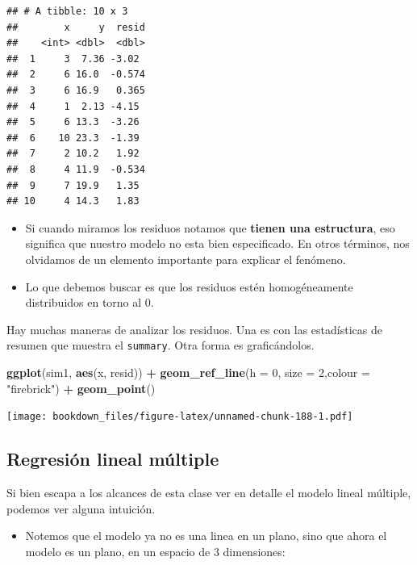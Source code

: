\documentclass[]{book}
\newenvironment{Shaded}{\begin{snugshade}}{\end{snugshade}}
\newcommand{\DataTypeTok}[1]{\textcolor[rgb]{0.13,0.29,0.53}{#1}}
\newcommand{\DecValTok}[1]{\textcolor[rgb]{0.00,0.00,0.81}{#1}}
\newcommand{\KeywordTok}[1]{\textcolor[rgb]{0.13,0.29,0.53}{\textbf{#1}}}
\newcommand{\NormalTok}[1]{#1}
\newcommand{\OperatorTok}[1]{\textcolor[rgb]{0.81,0.36,0.00}{\textbf{#1}}}
\newcommand{\StringTok}[1]{\textcolor[rgb]{0.31,0.60,0.02}{#1}}
\providecommand{\tightlist}{%
  \setlength{\itemsep}{0pt}\setlength{\parskip}{0pt}}
\begin{document}
\begin{verbatim}
## # A tibble: 10 x 3
##        x     y  resid
##    <int> <dbl>  <dbl>
##  1     3  7.36 -3.02 
##  2     6 16.0  -0.574
##  3     6 16.9   0.365
##  4     1  2.13 -4.15 
##  5     6 13.3  -3.26 
##  6    10 23.3  -1.39 
##  7     2 10.2   1.92 
##  8     4 11.9  -0.534
##  9     7 19.9   1.35 
## 10     4 14.3   1.83
\end{verbatim}

\begin{itemize}
\tightlist
\item
  Si cuando miramos los residuos notamos que \textbf{tienen una estructura}, eso significa que nuestro modelo no esta bien especificado. En otros términos, nos olvidamos de un elemento importante para explicar el fenómeno.
\item
  Lo que debemos buscar es que los residuos estén homogéneamente distribuidos en torno al 0.
\end{itemize}

Hay muchas maneras de analizar los residuos. Una es con las estadísticas de resumen que muestra el \texttt{summary}. Otra forma es graficándolos.

\begin{Shaded}
\begin{Highlighting}[]
\KeywordTok{ggplot}\NormalTok{(sim1, }\KeywordTok{aes}\NormalTok{(x, resid)) }\OperatorTok{+}\StringTok{ }
\StringTok{  }\KeywordTok{geom_ref_line}\NormalTok{(}\DataTypeTok{h =} \DecValTok{0}\NormalTok{, }\DataTypeTok{size =} \DecValTok{2}\NormalTok{,}\DataTypeTok{colour =} \StringTok{"firebrick"}\NormalTok{) }\OperatorTok{+}
\StringTok{  }\KeywordTok{geom_point}\NormalTok{() }
\end{Highlighting}
\end{Shaded}

\texttt{[image: bookdown\_files/figure-latex/unnamed-chunk-188-1.pdf]}

\hypertarget{regresion-lineal-multiple}{%
\subsection{Regresión lineal múltiple}\label{regresion-lineal-multiple}}

Si bien escapa a los alcances de esta clase ver en detalle el modelo lineal múltiple, podemos ver alguna intuición.

\begin{itemize}
\tightlist
\item
  Notemos que el modelo ya no es una linea en un plano, sino que ahora el modelo es un plano, en un espacio de 3 dimensiones:
\end{itemize}
\end{document}
